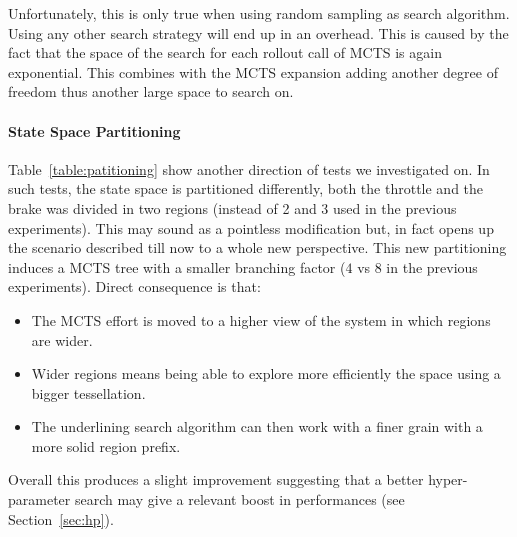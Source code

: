 \documentclass[11pt]{article}
\begin{document}
Unfortunately, this is only true when using random sampling as search algorithm. Using any other search strategy will end up in an overhead. 
This is caused by the fact that the space of the search for each rollout call of MCTS is again exponential. This combines with the MCTS expansion adding another degree of freedom thus another large space to search on. 


\paragraph{State Space Partitioning}
Table~\ref{table:patitioning} show another direction of tests we investigated on. In such tests, the state space is partitioned differently, both the throttle and the brake was divided in two regions (instead of 2 and 3 used in the previous experiments).
This may sound as a pointless modification but, in fact opens up the scenario described till now to a whole new perspective.
This new partitioning induces a MCTS tree with a smaller branching factor ($4$ vs $8$ in the previous experiments). Direct consequence is that:
\begin{itemize}
    \item The MCTS effort is moved to a higher view of the system in which regions are wider.
    \item Wider regions means being able to explore more efficiently the space using a bigger tessellation.
    \item The underlining search algorithm can then work with a finer grain with a more solid region prefix.
\end{itemize}
Overall this produces a slight improvement suggesting that a better hyper-parameter search may give a relevant boost in performances (see Section~\ref{sec:hp}).



\end{document}
